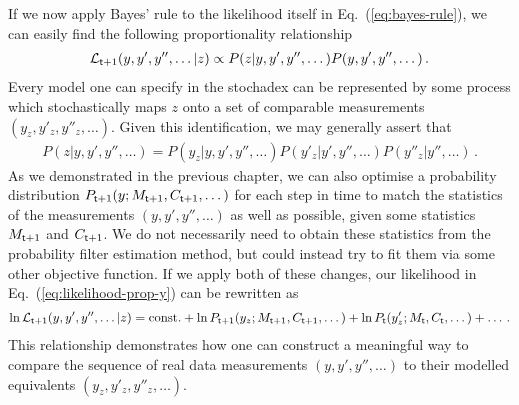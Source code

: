 If we now apply Bayes' rule to the likelihood itself in Eq.~(\ref{eq:bayes-rule}), we can easily find the following proportionality relationship
\begin{align}
{\cal L}_{{\sf t}+1}(y, y',y'', \dots\vert z) \propto P(z\vert y, y',y'', \dots)P(y, y',y'', \dots) \label{eq:likelihood-prop-y}\,.
\end{align}
Every model one can specify in the stochadex can be represented by some process which stochastically maps $z$ onto a set of comparable measurements $(y_z, y'_z,y''_z, \dots)$. Given this identification, we may generally assert that 
\begin{align}
P(z\vert y, y',y'', \dots) = P(y_z \vert y, y',y'', \dots)P(y'_z\vert y',y'', \dots)P(y''_z\vert y'', \dots)\,.
\end{align}
As we demonstrated in the previous chapter, we can also optimise a probability distribution $P_{{\sf t}+1}(y;M_{{\sf t}+1},C_{{\sf t}+1}, \dots)$ for each step in time to match the statistics of the measurements $(y, y', y'', \dots)$ as well as possible, given some statistics $M_{{\sf t}+1}$ and $C_{{\sf t}+1}$. We do not necessarily need to obtain these statistics from the probability filter estimation method, but could instead try to fit them via some other objective function. If we apply both of these changes, our likelihood in Eq.~(\ref{eq:likelihood-prop-y}) can be rewritten as
\begin{align}
\ln {\cal L}_{{\sf t}+1}(y, y',y'', \dots\vert z) = {\rm const.} + \ln P_{{\sf t}+1}(y_z;M_{{\sf t}+1},C_{{\sf t}+1},\dots ) + \ln P_{{\sf t}}(y'_z;M_{{\sf t}},C_{{\sf t}},\dots ) + \dots \label{eq:data-likelihood-for-model} \,.
\end{align}
This relationship demonstrates how one can construct a meaningful way to compare the sequence of real data measurements $(y, y', y'', \dots)$ to their modelled equivalents $(y_z, y'_z, y''_z, \dots)$.

